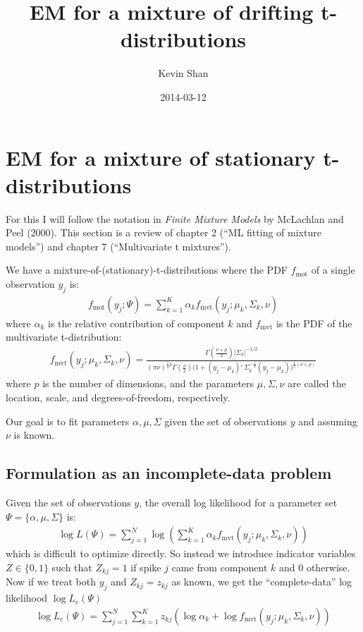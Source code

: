 \documentclass[11pt]{article}
\title{EM for a mixture of drifting t-distributions}
\author{Kevin Shan}
\date{2014-03-12}
\begin{document}
\maketitle

\section{EM for a mixture of stationary t-distributions}

For this I will follow the notation in \emph{Finite Mixture Models} by McLachlan and Peel (2000). This section is a review of chapter 2 (``ML fitting of mixture models'') and chapter 7 (``Multivariate t mixtures''). 

We have a mixture-of-(stationary)-t-distributions where the PDF $f_{\mathrm{mot}}$ of a single observation $y_j$ is:
\begin{align*}
	f_{\mathrm{mot}}(y_j; \Psi) = \sum_{k=1}^K \alpha_k f_{\mathrm{mvt}}(y_j; \mu_k, \Sigma_k, \nu)
\end{align*}
where $\alpha_k$ is the relative contribution of component $k$ and $f_{\mathrm{mvt}}$ is the PDF of the multivariate t-distribution:
\begin{align*}
	f_{\mathrm{mvt}}(y_j ; \mu_k, \Sigma_k, \nu)
	= 
	\frac{\Gamma\left(\frac{\nu + p}{2}\right) |\Sigma_k|^{-1/2}}
	{(\pi \nu)^{\frac12 p} \Gamma(\frac\nu2)\big(1 + (y_j-\mu_k)'\, \Sigma_k^{-\frac12}(y_j-\mu_k) \big)^{\frac12 (\nu+p)} }
\end{align*}
where $p$ is the number of dimensions, and the parameters $\mu, \Sigma, \nu$ are called the location, scale, and degrees-of-freedom, respectively.

Our goal is to fit parameters $\alpha, \mu, \Sigma$ given the set of observations $y$ and assuming $\nu$ is known.

\subsection{Formulation as an incomplete-data problem}

Given the set of observations $y$, the overall log likelihood for a parameter set $\Psi = \{\alpha, \mu, \Sigma\}$ is:
\begin{align*}
	\log L(\Psi) = \sum_{j=1}^N \log \left( \sum_{k=1}^K \alpha_k f_{\mathrm{mvt}}(y_j ; \mu_k, \Sigma_k, \nu) \right)
\end{align*}
which is difficult to optimize directly. So instead we introduce indicator variables $Z \in \{0,1\}$ such that $Z_{kj}=1$ if spike $j$ came from component $k$ and 0 otherwise. Now if we treat both $y_j$ and $Z_{kj}=z_{kj}$ as known, we get the ``complete-data'' log likelihood $\log L_c(\Psi)$
\begin{align}
	\log L_c(\Psi) = \sum_{j=1}^N \sum_{k=1}^K z_{kj} \left( \log \alpha_k + \log f_{\mathrm{mvt}}(y_j; \mu_k, \Sigma_k, \nu) \right)
	\label{eq_logLc}
\end{align}
\end{document}
